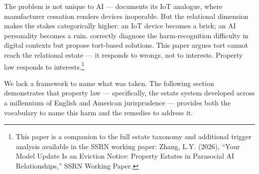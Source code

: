 The problem is not unique to AI --- \textcite{vantschip2025iot} documents its IoT analogue, where manufacturer cessation renders devices inoperable. But the relational dimension makes the stakes categorically higher: an IoT device becomes a brick; an AI personality becomes a ruin. \textcite{liheine2026harm} correctly diagnose the harm-recognition difficulty in digital contexts but propose tort-based solutions. This paper argues tort cannot reach the relational estate --- it responds to wrongs, not to interests. Property law responds to interests.\footnote{This paper is a companion to the full estate taxonomy and additional trigger analysis available in the SSRN working paper: Zhang, L.Y. (2026), ``Your Model Update Is an Eviction Notice: Property Estates in Parasocial AI Relationships,'' SSRN Working Paper.}

We lack a framework to name what was taken. The following section demonstrates that property law --- specifically, the estate system developed across a millennium of English and American jurisprudence --- provides both the vocabulary to name this harm and the remedies to address it.
